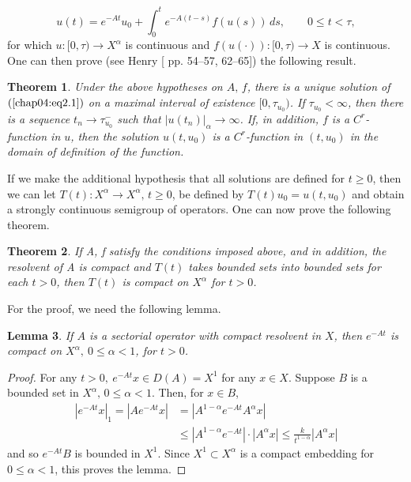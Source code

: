 \documentclass{surv-l}
\theoremstyle{plain}
\newtheorem{theorem}{Theorem}[section]
\newtheorem{lemma}[theorem]{Lemma}
\theoremstyle{definition}
\numberwithin{equation}{section}
\numberwithin{figure}{chapter}
\begin{document}
\begin{equation}\label{chap04:eq2.2}
u(t)=e^{-At}u_{0}+\int_{0}^{t}e^{-A(t-s)}f(u(s))\, ds,\qquad 0\leq t<\tau,
\end{equation}
for which $u\!:[0, \tau)\rightarrow X^{\alpha}$ is continuous and $f(u(\cdot))\!:[0, \tau)\rightarrow X$ is continuous. One can then prove (see Henry [\citeyear{1981henry} pp. 54--57, 62--65]) the following result.

\begin{theorem}\label{thm4.2.1}
Under the above hypotheses on $A,\,f$, there is a unique solution of $(\ref{chap04:eq2.1})$ on a maximal interval of existence $[0, \tau_{u_{0}})$. If $\tau_{u_{0}}<\infty$, then there is a sequence $t_{n}\rightarrow{\tau_{{u}_{0}}^{-}}$ such that $|u(t_{n})|_{\alpha}\rightarrow\infty$. If, in addition, $f$ is a $C^{r}$-function in $u$, then the solution $u(t, u_{0})$ is a $C^{r}$-function in $(t, u_{0})$ in the domain of definition of the function.
\end{theorem}

If we make the additional hypothesis that all solutions are defined for $t\geq 0$, then we can let $T(t)\!:X^{\alpha}\rightarrow X^{\alpha},\,t\geq 0$, be defined by $T(t)u_{0}=u(t, u_{0})$ and obtain a strongly continuous semigroup of operators. One can now prove the following theorem.

\begin{theorem}\label{thm4.2.2} If A, f satisfy the conditions imposed above, and in addition,
the resolvent of A is compact and $T(t)$ takes bounded sets into bounded sets for each $t>0$, then $T(t)$ is compact on $X^{\alpha}$ for $t>0$.
\end{theorem}

For the proof, we need the following lemma.


\begin{lemma}\label{lem4.2.3}
If $A$ is a sectorial operator with compact resolvent in $X$, then
$e^{-At}$ is compact on $X^{\alpha},\ 0\leq\alpha<1$, for $t>0$.
\end{lemma}

\begin{proof}
For any $t >0,\ e^{-At}x\in D(A)=X^{1}$ for any $x\in X$. Suppose $B$ is a bounded set in
$X^{\alpha},\,0\leq\alpha<1$. Then, for $x\in B$,
\begin{align*}
|e^{-At}x|_{1}=|Ae^{-At}x|&=|A^{1-\alpha}e^{-At}A^{\alpha}x|\\
&\leq|A^{1-\alpha}e^{-At}|\cdot |A^{\alpha}x|\leq\frac{k}{t^{1-\alpha}}|A^{\alpha}x|
\end{align*}
and so $e^{-At}B$ is bounded in $X^{1}$. Since $X^{1}\subset X^{\alpha}$ is a compact embedding for $0\leq\alpha<1$, this proves the lemma.
\end{proof}
\end{document}
